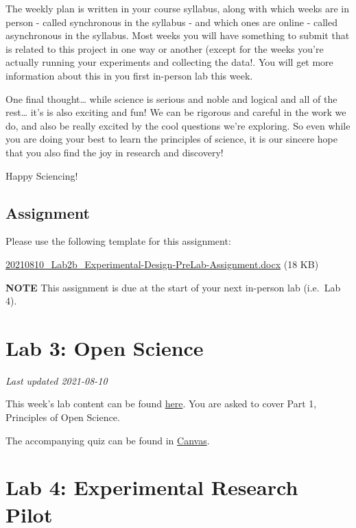 \documentclass[
]{book}
\begin{document}
The weekly plan is written in your course syllabus, along with which weeks are in person - called synchronous in the syllabus - and which ones are online - called asynchronous in the syllabus. Most weeks you will have something to submit that is related to this project in one way or another (except for the weeks you're actually running your experiments and collecting the data!. You will get more information about this in you first in-person lab this week.

One final thought\ldots{} while science is serious and noble and logical and all of the rest\ldots{} it's is also exciting and fun! We can be rigorous and careful in the work we do, and also be really excited by the cool questions we're exploring. So even while you are doing your best to learn the principles of science, it is our sincere hope that you also find the joy in research and discovery!

Happy Sciencing!

\hypertarget{assignment}{%
\section*{Assignment}\label{assignment}}

Please use the following template for this assignment:

\href{files/20210810_Lab2b_Experimental-Design-PreLab-Assignment-V1.docx}{20210810\_Lab2b\_Experimental-Design-PreLab-Assignment.docx} (18 KB)

\textbf{NOTE} This assignment is due at the start of your next in-person lab (i.e.~Lab 4).

\hypertarget{lab-3-open-science}{%
\chapter*{Lab 3: Open Science}\label{lab-3-open-science}}

\emph{Last updated 2021-08-10}

This week's lab content can be found \href{https://ubco-biology.github.io/OS-Introduction/}{here}. You are asked to cover Part 1, Principles of Open Science.

The accompanying quiz can be found in \href{https://canvas.ubc.ca}{Canvas}.

\hypertarget{lab-4-experimental-research-pilot}{%
\chapter*{Lab 4: Experimental Research Pilot}\label{lab-4-experimental-research-pilot}}
\end{document}
